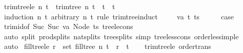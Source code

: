\begin{isabellebody}
\isanewline
{}\isamarkupfalse%
\ trim{\isacharunderscore}{\kern0pt}tree{\isacharunderscore}{\kern0pt}le{\isacharcolon}{\kern0pt}\ {\isachardoublequoteopen}{\isacharparenleft}{\kern0pt}n{\isacharprime}{\kern0pt}{\isacharcomma}{\kern0pt}\ t{\isacharprime}{\kern0pt}{\isacharparenright}{\kern0pt}\ {\isacharequal}{\kern0pt}\ trim{\isacharunderscore}{\kern0pt}tree\ n\ t\ {\isasymLongrightarrow}\ t{\isacharprime}{\kern0pt}\ {\isasymle}\ t{\isachardoublequoteclose}\isanewline
%
\isadelimproof
%
\endisadelimproof
%
\isatagproof
{}\isamarkupfalse%
\ {\isacharparenleft}{\kern0pt}induction\ n\ t\ arbitrary{\isacharcolon}{\kern0pt}\ n{\isacharprime}{\kern0pt}\ t{\isacharprime}{\kern0pt}\ rule{\isacharcolon}{\kern0pt}\ trim{\isacharunderscore}{\kern0pt}tree{\isachardot}{\kern0pt}induct{\isacharparenright}{\kern0pt}\isanewline
\ \ \isamarkupfalse%
\ {\isacharparenleft}{\kern0pt}{}\ va\ t\ ts{\isacharparenright}{\kern0pt}\isanewline
\ \ \isamarkupfalse%
\ \isamarkupfalse%
\ {\isacharquery}{\kern0pt}case\ \isamarkupfalse%
\ trim{\isacharunderscore}{\kern0pt}id{\isacharbrackleft}{\kern0pt}of\ {\isachardoublequoteopen}Suc\ {\isacharparenleft}{\kern0pt}Suc\ va{\isacharparenright}{\kern0pt}{\isachardoublequoteclose}\ {\isachardoublequoteopen}Node\ ts{\isachardoublequoteclose}{\isacharbrackright}{\kern0pt}\ tree{\isacharunderscore}{\kern0pt}le{\isacharunderscore}{\kern0pt}cons{}\isanewline
\ \ \ \ \isamarkupfalse%
\ {\isacharparenleft}{\kern0pt}auto\ split{\isacharcolon}{\kern0pt}\ prod{\isachardot}{\kern0pt}splits\ nat{\isachardot}{\kern0pt}splits\ tree{\isachardot}{\kern0pt}splits\ simp{\isacharcolon}{\kern0pt}\ tree{\isacharunderscore}{\kern0pt}less{\isacharunderscore}{\kern0pt}cons{\isacharprime}{\kern0pt}\ order{\isacharunderscore}{\kern0pt}less{\isacharunderscore}{\kern0pt}imp{\isacharunderscore}{\kern0pt}le{\isacharparenright}{\kern0pt}\ \isanewline
{}\isamarkupfalse%
\ auto%
\endisatagproof
{\isafoldproof}%
%
\isadelimproof
\isanewline
%
\endisadelimproof
\isanewline
{}\isamarkupfalse%
\ fill{\isacharunderscore}{\kern0pt}tree{\isacharunderscore}{\kern0pt}le{\isacharcolon}{\kern0pt}\ {\isachardoublequoteopen}r\ {\isasymin}\ set\ {\isacharparenleft}{\kern0pt}fill{\isacharunderscore}{\kern0pt}tree\ n\ t{\isacharparenright}{\kern0pt}\ {\isasymLongrightarrow}\ r\ {\isasymle}\ t{\isachardoublequoteclose}\isanewline
%
\isadelimproof
\ \ %
\endisadelimproof
%
\isatagproof
{}\isamarkupfalse%
\ trim{\isacharunderscore}{\kern0pt}tree{\isacharunderscore}{\kern0pt}le\ order{\isacharunderscore}{\kern0pt}trans\ \isamarkupfalse%

\end{isabellebody}
